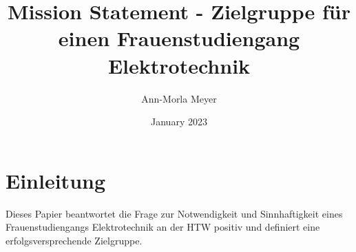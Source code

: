 \documentclass[a4paper, 12 pt]{IEEEtran}
\title{Mission Statement - Zielgruppe für einen Frauenstudiengang Elektrotechnik}
\author{Ann-Morla Meyer}
\date{January 2023}
\begin{document}
\fancyhf{} %
\fancyfoot[C]{\thepage} %
\maketitle
\thispagestyle{fancy}%


\maketitle


\section{Einleitung}
Dieses Papier beantwortet die Frage zur Notwendigkeit und Sinnhaftigkeit eines Frauenstudiengangs Elektrotechnik an der HTW positiv und definiert eine erfolgsversprechende Zielgruppe. 
\end{document}
